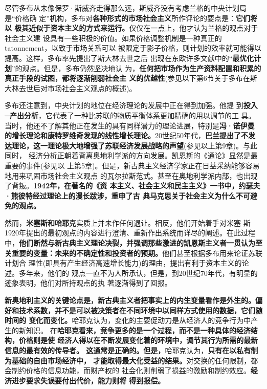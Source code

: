 尽管多布从未像保罗·斯威齐走得那么远，斯威齐没有考虑兰格的中央计划局是“价格确
定”机构，多布对\textbf{各种形式的市场社会主义}所作评论的要点是：\textbf{它们将以
  极其近似于资本主义的方式来运行。}仅仅在一点上，他才认为兰格的观点对于社会主义建
设具有一些积极的价值。如果价格调整机制是一种真正的tatonnement，以致于市场关系可以
被限定于影子价格，则计划的效率就可能得以提高。这样，多布率先提出了斯大林去世之后
出现在东欧许多文献中的“\textbf{最优化计划}”的观点。但是，多布仍然坚决地认
为，\textbf{任何把市场作为生产资料配置和积累的真正手段的试图，都将逐渐削弱社会主
  义的优越性}(参见以下第6节关于多布在斯大林去世后对市场社会主义观点的概述)。

多布还注意到，中央计划的地位在经济理论的发展中正在得到加强。他提
到\textbf{投入─产出分析}，它代表了一种比苏联的物质平衡体系更加精确的用以调节的工
具。当时，他还不了解其他正在发生的具有同样潜力的理论进展，特别是\textbf{冯·诺伊曼
  的增长理论和康特罗维奇发现的线性增长理论。}20世纪50年代，\textbf{巴兰提出了不发
  达理论，这一理论极大地增强了苏联经济发展战略的声望}(参见以上第9章)。与此同时，
经济分析正朝着背离奥地利学派的方向发展。凯恩斯的《通论》显然是最重要的事件(参见以
上第5章)。但是，新古典主义经济学家正在日益采纳能够容易地用来巩固市场社会主义观点
的瓦尔拉斯范式。甚至在奥地利学派内部，也出现了背叛。\textbf{1942年，在著名的《资
  本主义、社会主义和民主主义》一书中，约瑟夫·熊彼特经过理论上的漫长跋涉，重申了古
  典马克思关于社会主义为什么不可避免的观点。}

然而，\textbf{米塞斯和哈耶克}实质上并未作任何退让。相反，他们开始着手对米塞
斯1920年提出的最初观点的内容进行澄清、重新作出系统而详尽的阐述。在此过程
中，\textbf{他们断然与新古典主义理论决裂，并强调那些激进的凯恩斯主义者一贯认为至
  关重要的变量：未来的不确定性和投资者的预期。}他们甚至根据多布用来论证苏联计划合
理性(即具有产生经济高速增长能力)的理由，提出有利于资本主义的论述。多年来，他们的
观点一直不为人所承认，但是，到20世纪70年代，有明显的迹象表明，他们对所持观点的执
著逐渐得到了回报。

\textbf{新奥地利主义的关键论点是，新古典主义者把事实上的内生变量看作是外生的。偏
  好和技术系数，并不是可以被决策者在不同环境中以同样方式使用的数据，它们随时间的
  变化而变化。}哈耶克认为，变化的主要促动力是从经济人的竞争行为中产生的新知识。
在\textbf{哈耶克看来，竞争更多的是一个过程，而不是一种具体的经济结构，价格则是使
  经济人得以在不断发展变化着的环境中，调节其行为所需的最新信息的最有效的传导者。
  这通常是正确的。但是，}哈耶克认为，\textbf{只有在以私有制为基础的自由市场经济中，
  才能取得最大化受益的结果。}对交换的任何限制，都会制约价格的信息功能，而财产权的
社会化则削弱了损益的激励和制约效应。\textbf{经济进步要求失误要付出代价，能力则将
  得到报偿。}

